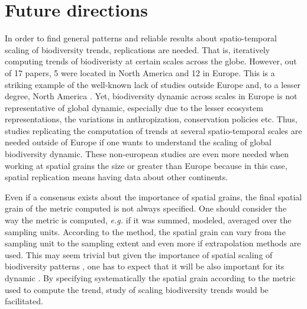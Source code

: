 \documentclass[
  12pt,
  oneside]{report}
\begin{document}
\hypertarget{future-directions}{%
\chapter{Future directions}\label{future-directions}}

In order to find general patterns and reliable results about spatio-temporal scaling of biodiversity trends, replications are needed. That is, iteratively computing trends of biodiveristy at certain scales across the globe. However, out of 17 papers, 5 were located in North America and 12 in Europe. This is a striking example of the well-known lack of studies outside Europe and, to a lesser degree, North America \autocite{fraixedas_state_2020}. Yet, biodiversity dynamic across scales in Europe is not representative of global dynamic, especially due to the lesser ecosystem representations, the variations in anthropization, conservation policies etc. Thus, studies replicating the computation of trends at several spatio-temporal scales are needed outside of Europe if one wants to understand the scaling of global biodiversity dynamic. These non-european studies are even more needed when working at spatial grains the size or greater than Europe because in this case, spatial replication means having data about other continents.

Even if a consensus exists about the importance of spatial grains, the final spatial grain of the metric computed is not always specified. One should consider the way the metric is computed, \emph{e.g.} if it was summed, modeled, averaged over the sampling units. According to the method, the spatial grain can vary from the sampling unit to the sampling extent and even more if extrapolation methods are used. This may seem trivial but given the importance of spatial scaling of biodiversity patterns \autocite{storch_untangling_2004}, one has to expect that it will be also important for its dynamic \autocite[\emph{e.g.}][]{chase_species_2019}. By specifying systematically the spatial grain according to the metric used to compute the trend, study of scaling biodiversity trends would be facilitated.
\end{document}

